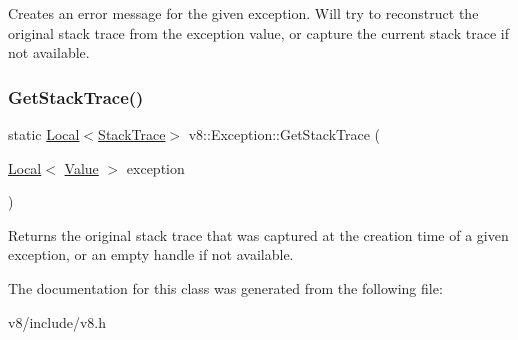 Creates an error message for the given exception. Will try to reconstruct the original stack trace from the exception value, or capture the current stack trace if not available. \mbox{\label{classv8_1_1Exception_a81d1fd3c8d729e9a8d830bc2830bfe77}} 
\subsubsection{\texorpdfstring{Get\+Stack\+Trace()}{GetStackTrace()}}
{\footnotesize\ttfamily static \mbox{\hyperlink{classv8_1_1Local}{Local}}$<$\mbox{\hyperlink{classv8_1_1StackTrace}{Stack\+Trace}}$>$ v8\+::\+Exception\+::\+Get\+Stack\+Trace (\begin{DoxyParamCaption}\item[{\mbox{\hyperlink{classv8_1_1Local}{Local}}$<$ \mbox{\hyperlink{classv8_1_1Value}{Value}} $>$}]{exception }\end{DoxyParamCaption})\hspace{0.3cm}{\ttfamily [static]}}

Returns the original stack trace that was captured at the creation time of a given exception, or an empty handle if not available. 

The documentation for this class was generated from the following file\+:\begin{DoxyCompactItemize}
\item 
v8/include/v8.\+h\end{DoxyCompactItemize}
